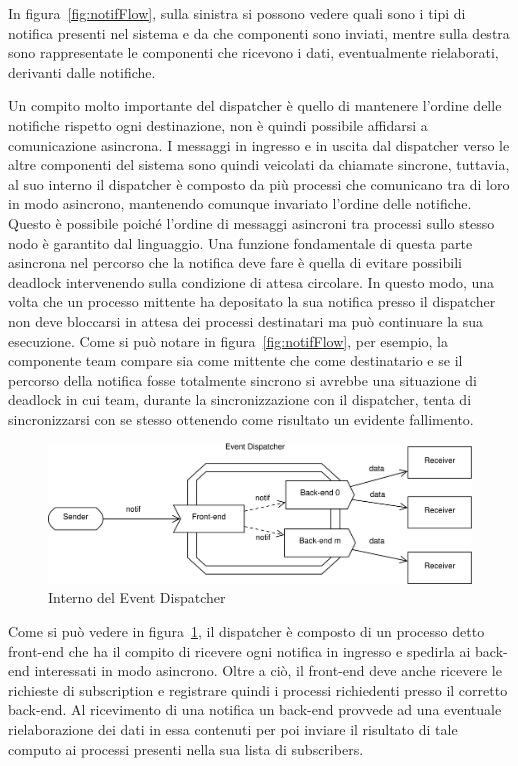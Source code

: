 \documentclass[11pt,a4paper]{report}
\begin{document}
In figura~\ref{fig:notifFlow}, sulla sinistra si possono vedere quali sono i tipi di notifica presenti nel sistema e da che componenti sono inviati, mentre sulla destra sono rappresentate le componenti che ricevono i dati, eventualmente rielaborati, derivanti dalle notifiche.

Un compito molto importante del dispatcher è quello di mantenere l'ordine delle notifiche rispetto ogni destinazione, non è quindi possibile affidarsi a comunicazione asincrona.
I messaggi in ingresso e in uscita dal dispatcher verso le altre componenti del sistema sono quindi veicolati da chiamate sincrone, tuttavia, al suo interno il dispatcher è composto da più processi che comunicano tra di loro in modo asincrono, mantenendo comunque invariato l'ordine delle notifiche.
Questo è possibile poiché l'ordine di messaggi asincroni tra processi sullo stesso nodo è garantito dal linguaggio. Una funzione fondamentale di questa parte asincrona nel percorso che la notifica deve fare è quella di evitare possibili deadlock intervenendo sulla condizione di attesa circolare. In questo modo, una volta che un processo mittente ha depositato la sua notifica presso il dispatcher non deve bloccarsi in attesa dei processi destinatari ma può continuare la sua esecuzione.
Come si può notare in figura~\ref{fig:notifFlow}, per esempio, la componente team compare sia come mittente che come destinatario e se il percorso della notifica fosse totalmente sincrono si avrebbe una situazione di deadlock in cui team, durante la sincronizzazione con il dispatcher, tenta di sincronizzarsi con se stesso ottenendo come risultato un evidente fallimento.
\begin{figure}
\includegraphics[width=\textwidth]{diagrammi/Dispatcher}
\caption{Interno del Event Dispatcher}
\label{fig:dispatcher}
\end{figure}

Come si può vedere in figura~\ref{fig:dispatcher}, il dispatcher è composto di un processo detto front-end che ha il compito di ricevere ogni notifica in ingresso e spedirla ai back-end interessati in modo asincrono. Oltre a ciò, il front-end deve anche ricevere le richieste di subscription e registrare quindi i processi richiedenti presso il corretto back-end. Al ricevimento di una notifica un back-end provvede ad una eventuale rielaborazione dei dati in essa contenuti per poi inviare il risultato di tale computo ai processi presenti nella sua lista di subscribers.
\end{document}
